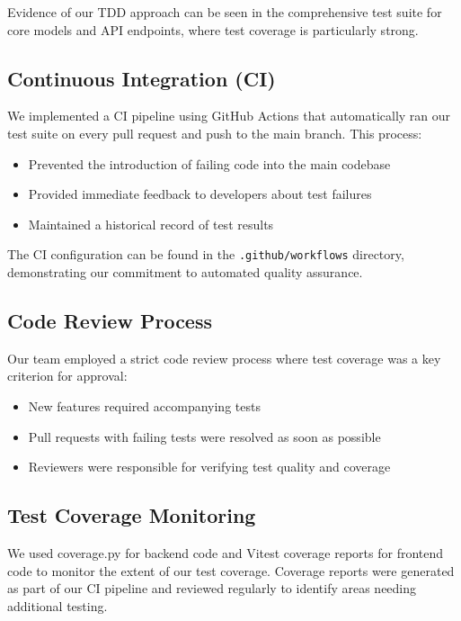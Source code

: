 Evidence of our TDD approach can be seen in the comprehensive test suite for core models and API endpoints, where test coverage is particularly strong.

\subsection{Continuous Integration (CI)}

We implemented a CI pipeline using GitHub Actions that automatically ran our test suite on every pull request and push to the main branch. This process:

\begin{itemize}
    \item Prevented the introduction of failing code into the main codebase
    \item Provided immediate feedback to developers about test failures
    \item Maintained a historical record of test results
\end{itemize}

The CI configuration can be found in the \texttt{.github/workflows} directory, demonstrating our commitment to automated quality assurance.

\subsection{Code Review Process}

Our team employed a strict code review process where test coverage was a key criterion for approval:

\begin{itemize}
    \item New features required accompanying tests
    \item Pull requests with failing tests were resolved as soon as possible
    \item Reviewers were responsible for verifying test quality and coverage
\end{itemize}

\subsection{Test Coverage Monitoring}

We used coverage.py for backend code and Vitest coverage reports for frontend code to monitor the extent of our test coverage. Coverage reports were generated as part of our CI pipeline and reviewed regularly to identify areas needing additional testing.

